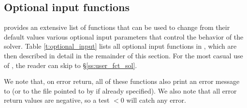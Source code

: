 \subsection{Optional input functions}\label{ss:optional_input}

{\kinsol} provides an extensive list of functions that can be used to change
from their default values various optional input parameters that control the
behavior of the {\kinsol} solver. 
Table \ref{t:optional_input} lists all optional input functions in {\kinsol}, which 
are then described in detail in the remainder of this section.
For the most casual use of {\kinsol}, the reader can skip to \S\ref{ss:user_fct_sol}.

We note that, on error return, all of these functions also print an error message
to  (or to the file pointed to by  if already specified).
We also note that all error return values are negative, so a test  $<0$
will catch any error.

